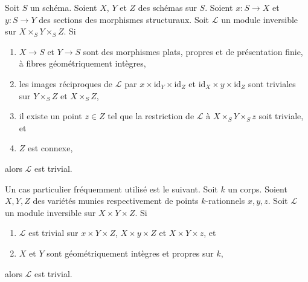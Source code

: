 \begin{theorem}
\label{theorem-of-the-cube}
Soit $S$ un schéma. Soient $X$, $Y$ et $Z$ des schémas sur $S$.
Soient $x : S \to X$ et $y : S \to Y$ des sections des morphismes structuraux.
Soit $\mathcal{L}$ un module inversible sur $X \times_S Y \times_S Z$. Si
\begin{enumerate}
\item $X \to S$ et $Y \to S$ sont des morphismes plats, propres
et de présentation finie, à fibres géométriquement intègres,
\item les images réciproques de $\mathcal{L}$ par
$x \times \text{id}_Y \times \text{id}_Z$ et
$\text{id}_X \times y \times \text{id}_Z$
sont triviales sur $Y \times_S Z$ et $X \times_S Z$,
\item il existe un point $z \in Z$ tel que la restriction de $\mathcal{L}$
à $X \times_S Y \times_S z$ soit triviale, et
\item $Z$ est connexe,
\end{enumerate}
alors $\mathcal{L}$ est trivial.
\end{theorem}

\noindent
Un cas particulier fréquemment utilisé est le suivant.
Soit $k$ un corps. Soient $X, Y, Z$ des variétés munies respectivement de
points $k$-rationnels $x, y, z$. Soit $\mathcal{L}$ un module inversible
sur $X \times Y \times Z$. Si
\begin{enumerate}
\item $\mathcal{L}$ est trivial sur
$x \times Y \times Z$, $X \times y \times Z$ et $X \times Y \times z$, et
\item $X$ et $Y$ sont géométriquement intègres et propres sur $k$,
\end{enumerate}
alors $\mathcal{L}$ est trivial.

